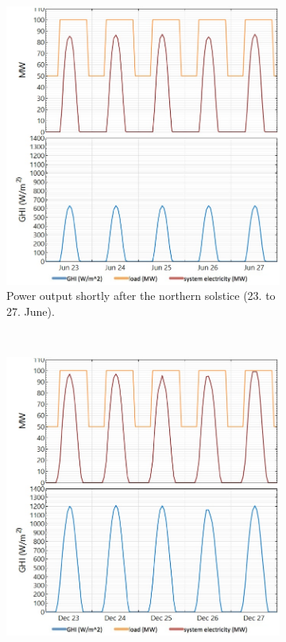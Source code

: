 \begin{figure}[!htbp]
        \centering                
        \begin{subfigure}[b]{0.5\textwidth}
                \centering
                \includegraphics[width=1\textwidth]{FIG/PVwithoutEESwinter}
                \caption{Power output shortly after the northern solstice (23. to 27. June).}\label{PVwithoutEESwinter}
        \end{subfigure}%
        ~
        \begin{subfigure}[b]{0.5\textwidth}
                \centering
                \includegraphics[width=1\textwidth]{FIG/PVwithoutEESsummer}

\end{subfigure}
\end{figure}
